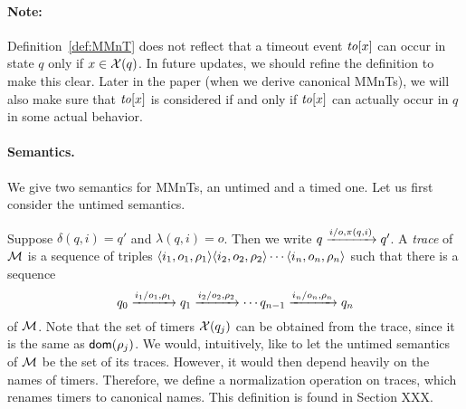 \paragraph{Note:}
Definition~\ref{def:MMnT}
does not reflect that a timeout event $\mathit{to}[x]$ can
occur in state $q$ only if $x \in \mathcal{X}(q)$. In future updates, we  should
refine the definition to make this clear. Later in the paper (when we
derive canonical MMnTs), we will also
make sure that $\mathit{to}[x]$ is considered if and only if $\mathit{to}[x]$ can
actually occur in $q$ in some actual behavior.


\paragraph{Semantics.}
We give two semantics for MMnTs, an untimed and a timed one. Let us
first consider the untimed semantics.

Suppose $\delta(q,i) = q'$ and $\lambda(q,i)= o$.
Then we write $q \xrightarrow{i/o,\pi(q,i)} q'$.
A \emph{trace} of ${\cal M}$ is a sequence of
triples
$\langle i_1,o_1,\rho_1\rangle\langle i_2,o_2,\rho_2\rangle
\cdots\langle i_n,o_n,\rho_n\rangle$ such that there is a sequence 
\[
q_0 \xrightarrow{i_1/o_1,\rho_1} q_1
\xrightarrow{i_2/o_2,\rho_2}
\cdots
q_{n-1} \xrightarrow{i_n/o_n,\rho_n} q_n
\]
of ${\cal M}$.
Note that the set of timers $\mathcal{X}(q_j)$ can be obtained from the trace,
since it is the same as ${\textsf{dom}}(\rho_j)$.
We would, intuitively, like to let the untimed semantics of ${\cal M}$ be the set
of its traces. However, it would then depend heavily on the names of
timers. Therefore, we define a normalization operation on traces, which
renames timers to canonical names. This definition is found in
Section XXX.

